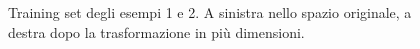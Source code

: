 \documentclass [11pt,a4paper,twoside,openright] {book}
\begin{document}
\begin{figure}[!h]
          \caption{Training set degli esempi 1 e 2. A sinistra nello spazio originale, a destra dopo la trasformazione in più dimensioni.}
\end{figure}
\end{document}
